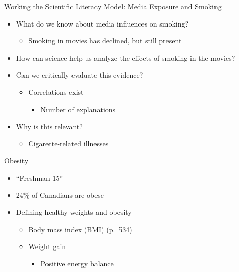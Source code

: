 \documentclass[
]{book}
\providecommand{\tightlist}{%
  \setlength{\itemsep}{0pt}\setlength{\parskip}{0pt}}
\begin{document}
\begin{reflect}
Working the Scientific Literacy Model: Media Exposure and Smoking

\begin{itemize}
\tightlist
\item
  What do we know about media influences on smoking?

  \begin{itemize}
  \tightlist
  \item
    Smoking in movies has declined, but still present\\
  \end{itemize}
\item
  How can science help us analyze the effects of smoking in the movies?\\
\item
  Can we critically evaluate this evidence?

  \begin{itemize}
  \tightlist
  \item
    Correlations exist

    \begin{itemize}
    \tightlist
    \item
      Number of explanations\\
    \end{itemize}
  \end{itemize}
\item
  Why is this relevant?

  \begin{itemize}
  \tightlist
  \item
    Cigarette-related illnesses
  \end{itemize}
\end{itemize}

Obesity

\begin{itemize}
\tightlist
\item
  ``Freshman 15''\\
\item
  24\% of Canadians are obese\\
\item
  Defining healthy weights and obesity

  \begin{itemize}
  \tightlist
  \item
    Body mass index (BMI) (p.~534)\\
  \item
    Weight gain

    \begin{itemize}
    \tightlist
    \item
      Positive energy balance
    \end{itemize}
  \end{itemize}
\end{itemize}


\end{reflect}
\end{document}
